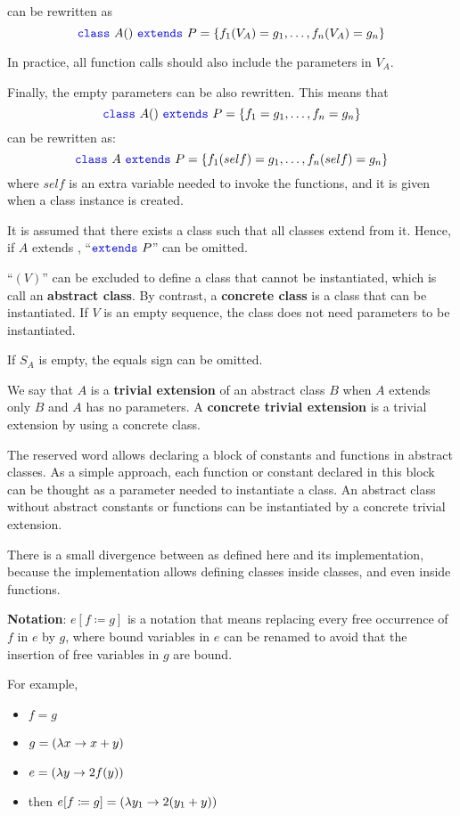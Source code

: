 can be rewritten as
\[\sodaclass\ A() \ \sodaextends\ P = \{
f_{1}(V_{A}) = g_{1},
\ldots ,
f_{n}(V_{A}) = g_{n}
\}
\]

In practice, all function calls should also include the parameters in $V_{A}$.

Finally, the empty parameters can be also rewritten.
This means that
\[\sodaclass\ A() \ \sodaextends\ P = \{
f_{1} = g_{1},
\ldots ,
f_{n} = g_{n}
\}
\]
can be rewritten as:
\[\sodaclass\ A \ \sodaextends\ P = \{
f_{1}(self) = g_{1},
\ldots ,
f_{n}(self) = g_{n}
\}
\]
where $self$ is an extra variable needed to invoke the functions, and it is given when a class instance is created.

It is assumed that there exists a class  such that all classes extend from it.
Hence, if $A$ extends , ``$\sodaextends\ P$'' can be omitted.

``$(V)$'' can be excluded to define a class that cannot be instantiated, which is call an \textbf{abstract class}.
By contrast, a \textbf{concrete class} is a class that can be instantiated.
If $V$ is an empty sequence, the class does not need parameters to be instantiated.

If $S_{A}$ is empty, the equals sign can be omitted.

We say that $A$ is a \textbf{trivial extension} of an abstract class $B$ when $A$ extends only $B$ and $A$ has no parameters.
A \textbf{concrete trivial extension} is a trivial extension by using a concrete class.

The \sodaabstract reserved word allows declaring a block of constants and functions in abstract classes.
As a simple approach, each function or constant declared in this block can be thought as a parameter needed to instantiate a class.
An abstract class without abstract constants or functions can be instantiated by a concrete trivial extension.

There is a small divergence between \Soda as defined here and its implementation, because the implementation allows defining classes inside classes, and even inside functions.

\textbf{Notation}: $e[f \coloneqq g]$ is a notation that means replacing every free occurrence of $f$ in $e$ by $g$, where bound variables in $e$ can be renamed to avoid that the insertion of free variables in $g$ are bound.

For example,
\begin{itemize}
    \item $f = g$
    \item $g = (\lambda {x} \to {x + y})$
    \item $e = (\lambda {y} \to {2 f(y)})$
    \item then $e[f \coloneqq g] = (\lambda {y_{1}} \to {2 (y_{1} + y)})$
\end{itemize}

